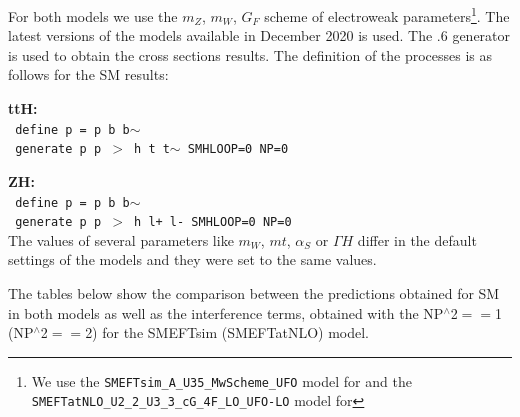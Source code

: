 For both models we use the $m_Z$, $m_W$, $G_F$ scheme of electroweak parameters\footnote{We use the \texttt{SMEFTsim\_A\_U35\_MwScheme\_UFO} model for \SMEFTsim and the \texttt{SMEFTatNLO\_U2\_2\_U3\_3\_cG\_4F\_LO\_UFO-LO} model for \SMEFTatNLO}. The latest versions of the models available in December 2020 is used.  The .6 generator is used to obtain the cross sections results. The definition of the processes is as follows for the SM results:

\noindent
{\bf ttH:}\\
\noindent
  \texttt{ define p = p b b$\sim$ }\\
  \texttt{ generate p p $>$ h t t$\sim$ SMHLOOP=0 NP=0 }

\noindent
{\bf ZH:}\\
  \noindent
  \texttt{ define p = p b b$\sim$} \\
  \texttt{ generate p p $>$ h l+ l- SMHLOOP=0  NP=0     }\\
  
  The values of several parameters like $m_W$, $mt$, $\alpha_S$ or $\Gamma H$ differ in the default settings of the models and they were set to the same values.

  The tables below show the comparison between the predictions obtained for SM in both models as well as the interference terms, obtained with the NP$^{\wedge}$2$==$1 (NP$^{\wedge}$2$==$2)  for the SMEFTsim (SMEFTatNLO) model.

